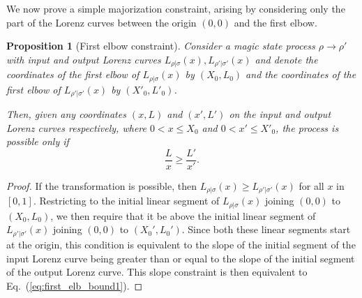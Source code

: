 \documentclass[
twocolumn,
superscriptaddress
]{revtex4-1}
\newtheorem{proposition}[theorem]{Proposition}
\begin{document}
We now prove a simple majorization constraint, arising by considering only the part of the Lorenz curves between the origin $(0,0)$ and the first elbow.
\begin{proposition}[First elbow constraint]\label{prop:first_elb}
	Consider a magic state process $\rho \longrightarrow \rho'$ with input and output Lorenz curves $L_{\rho|\sigma}(x), L_{\rho'|\sigma'}(x)$ and denote the coordinates of the first elbow of $L_{\rho|\sigma}(x)$ by $(X_0, L_0)$ and the coordinates of the first elbow of $L_{\rho' |\sigma'}(x)$ by $(X'_0, L'_0)$.
	
Then, given any coordinates $(x, L)$ and $(x', L')$ on the input and output Lorenz curves respectively, where $0 < x \leq X_0$ and $0 < x' \leq X'_0$, the process is possible only if
\begin{equation}\label{eq:first_elb_bound1}
	\frac{L}{x} \geq \frac{L'}{x'}.
\end{equation}
\end{proposition}
\begin{proof} 
	If the transformation is possible, then $L_{\rho|\sigma}(x) \geq L_{\rho'|\sigma'} (x)$ for all $x$ in $[0,1]$. 
	Restricting to the initial linear segment of $L_{\rho|\sigma}(x)$ joining $(0,0)$ to $(X_0,L_0)$, we then require that it be above the initial linear segment of $L_{\rho'|\sigma'}(x)$ joining $(0,0)$ to $(X_0', L_0')$. 
	Since both these linear segments start at the origin, this condition is equivalent to the slope of the initial segment of the input Lorenz curve being greater than or equal to the slope of the initial segment of the output Lorenz curve. 
	This slope constraint is then equivalent to Eq.~(\ref{eq:first_elb_bound1}). \end{proof}
\end{document}
